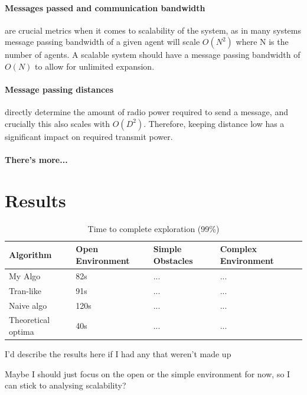 \documentclass[runningheads]{llncs}
\begin{document}
\paragraph{Messages passed and communication bandwidth} are crucial metrics when it comes to scalability of the system, as in many systems message passing bandwidth of a given agent will scale $O(N^2)$ where N is the number of agents. A scalable system should have a message passing bandwidth of $O(N)$ to allow for unlimited expansion.

\paragraph{Message passing distances} directly determine the amount of radio power required to send a message, and crucially this also scales with $O(D^2)$. Therefore, keeping distance low has a significant impact on required transmit power.

\paragraph{There's more...}


\newpage
\section{Results}

\begin{table}
\caption{Time to complete exploration (99\%)}\label{tab1}
\begin{tabular}{|l|l|l|l|}
\hline
Algorithm &  Open Environment & Simple Obstacles & Complex Environment\\
\hline
My Algo             & 82s  & ... & ...\\
Tran-like           & 91s  & ... & ...\\
Naive algo          & 120s & ... & ...\\
Theoretical optima  & 40s  & ... & ...\\
\hline
\end{tabular}
\end{table}

I'd describe the results here if I had any that weren't made up


Maybe I should just focus on the open or the simple environment for now, so I can stick to analysing scalability?




\end{document}
